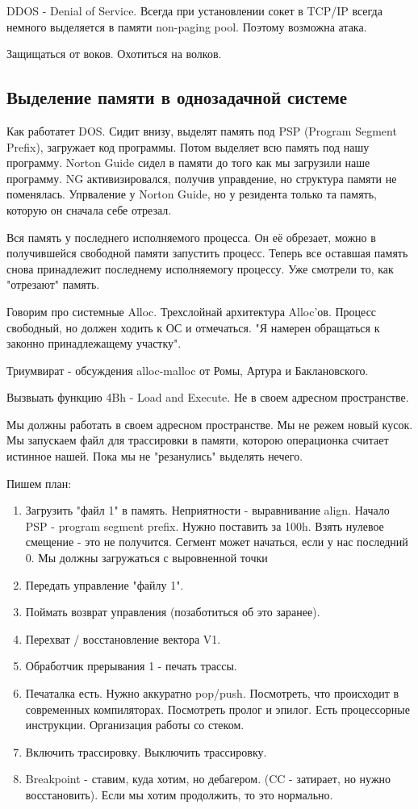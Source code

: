 DDOS - Denial of Service. Всегда при установлении сокет в TCP/IP всегда немного выделяется в памяти non-paging pool. Поэтому возможна атака.

\begin{off}Защищаться от воков. Охотиться на волков.\end{off} 

\subsection{Выделение памяти в однозадачной системе}
Как работатет DOS. Сидит внизу, выделят память под PSP (Program Segment Prefix), загружает код программы. Потом выделяет всю память под нашу программу. Norton Guide сидел в памяти до того как мы загрузили наше программу. NG активизировался, получив управдение, но структура памяти не поменялась. Упрваление у Norton Guide, но у резидента только та память, которую он сначала себе отрезал.

Вся память у последнего исполняемого процесса. Он её обрезает, можно в получившейся свободной памяти запустить процесс. Теперь все оставшая память снова принадлежит последнему исполняемогу процессу. Уже смотрели то, как "отрезают" память.

Говорим про системные Alloc. Трехслойнай архитектура Alloc'ов. Процесс свободный, но должен ходить к ОС и отмечаться. "Я намерен обращаться к законно принадлежащему участку".

Триумвират - обсуждения alloc-malloc от Ромы, Артура и Баклановского.
 
Вызвыать функцию 4Bh - Load and Execute. Не в своем адресном пространстве.

Мы должны работать в своем адресном пространстве. Мы не режем новый кусок. Мы запускаем файл для трассировки в памяти, которою операционка считает истинное нашей. Пока мы не "резанулись" выделять нечего. 

Пишем план:
\begin{enumerate}
\item Загрузить "файл 1" в память. Неприятности - выравнивание align. Начало PSP - program segment prefix. Нужно поставить за 100h. Взять нулевое смещение - это не получится. Сегмент может начаться, если у нас последний 0.
Мы должны загружаться с выровненной точки
\item Передать управление "файлу 1".
\item Поймать возврат управления (позаботиться об это заранее).
\item Перехват / восстановление вектора V1.
\item Обработчик прерывания 1 - печать трассы.
\item Печаталка есть. Нужно аккуратно pop/push. Посмотреть, что происходит в современных компиляторах. Посмотреть пролог и эпилог. Есть процессорные инструкции. Организация работы со стеком.
\item Включить трассировку. Выключить трассировку.
\item Breakpoint - ставим, куда хотим, но дебагером. (CC - затирает, но нужно восстановить). Если мы хотим продолжить, то это нормально.
\end{enumerate}

